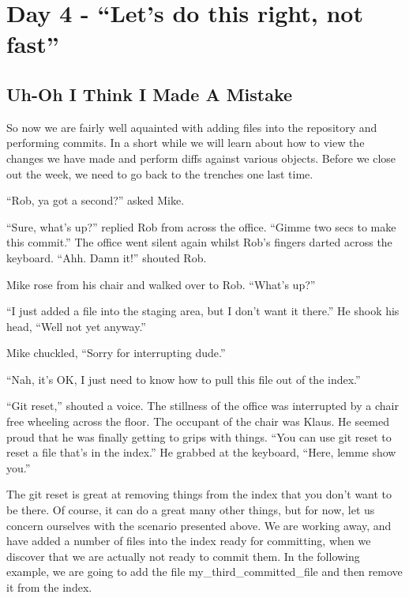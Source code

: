 \section{Day 4 - ``Let's do this right, not fast''}

\subsection{Uh-Oh I Think I Made A Mistake}

So now we are fairly well aquainted with adding files into the repository and performing commits.  In a short while we will learn about how to view the changes we have made and perform diffs against various objects.  Before we close out the week, we need to go back to the trenches one last time.

\begin{trenches}
``Rob, ya got a second?'' asked Mike.

``Sure, what's up?'' replied Rob from across the office.  ``Gimme two secs to make this commit.''  The office went silent again whilst Rob's fingers darted across the keyboard.  ``Ahh.  Damn it!'' shouted Rob.  

Mike rose from his chair and walked over to Rob.  ``What's up?''

``I just added a file into the staging area, but I don't want it there.''  He shook his head, ``Well not yet anyway.''

Mike chuckled, ``Sorry for interrupting dude.''

``Nah, it's OK, I just need to know how to pull this file out of the index.''

``Git reset,'' shouted a voice.  The stillness of the office was interrupted by a chair free wheeling across the floor.  The occupant of the chair was Klaus.  He seemed proud that he was finally getting to grips with things.  ``You can use git reset to reset a file that's in the index.''  He grabbed at the keyboard, ``Here, lemme show you.''
\end{trenches}

The git reset is great at removing things from the index that you don't want to be there.  Of course, it can do a great many other things, but for now, let us concern ourselves with the scenario presented above.  We are working away, and have added a number of files into the index ready for committing, when we discover that we are actually not ready to commit them.  In the following example, we are going to add the file my\_third\_committed\_file and then remove it from the index.

